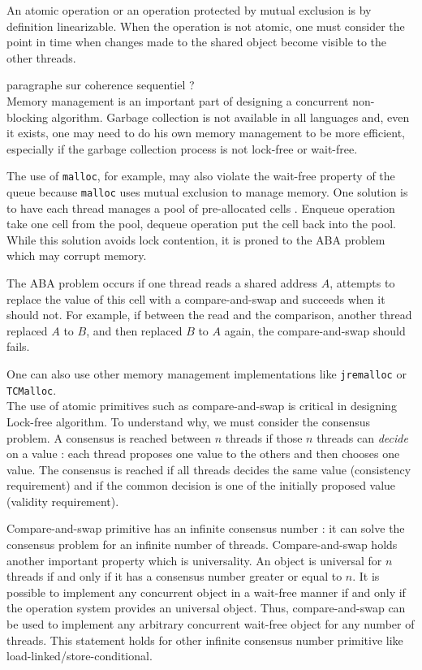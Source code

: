 An atomic operation or an operation protected by mutual exclusion is by
definition linearizable. When the operation is not atomic, one must consider the
point in time when changes made to the shared object become visible to the other
threads.

paragraphe sur coherence sequentiel ? \\

 Memory management is an important part of designing a
concurrent non-blocking algorithm. Garbage collection is not available in all
languages and, even it exists, one may need to do his own memory management to
be more efficient, especially if the garbage collection process is not lock-free
or wait-free.

The use of \texttt{malloc}, for example, may also violate the wait-free property
of the queue because \texttt{malloc} uses mutual exclusion to manage memory. One
solution is to have each thread manages a pool of pre-allocated cells
\cite{Herlihy08}. Enqueue operation take one cell from the pool, dequeue
operation put the cell back into the pool. While this solution avoids lock
contention, it is proned to the ABA problem which may corrupt memory.

The ABA problem occurs if one thread reads a shared address $A$, attempts to
replace the value of this cell with a compare-and-swap and succeeds when it
should not. For example, if between the read and the comparison, another thread
replaced $A$ to $B$, and then replaced $B$ to $A$ again, the compare-and-swap
should fails.

One can also use other memory management implementations like \texttt{jremalloc}
or \texttt{TCMalloc}. \\

 The use of atomic primitives such as compare-and-swap is
critical in designing Lock-free algorithm. To understand why, we must consider
the consensus problem. A consensus is reached between $n$ threads if those $n$
threads can \textit{decide} on a value : each thread proposes one value to the
others and then chooses one value. The consensus is reached if all threads
decides the same value (consistency requirement) and if the common decision is
one of the initially proposed value (validity requirement).

Compare-and-swap primitive has an infinite consensus number
\cite{Herlihy:1991:WS:114005.102808} : it can solve the consensus problem for an
infinite number of threads. Compare-and-swap holds another important property
which is universality. An object is universal for $n$ threads if and only if it
has a consensus number greater or equal to $n$. It is possible to implement any
concurrent object in a wait-free manner if and only if the operation system
provides an universal object. Thus, compare-and-swap can be used to implement
any arbitrary concurrent wait-free object for any number of threads. This
statement holds for other infinite consensus number primitive like
load-linked/store-conditional. \\

